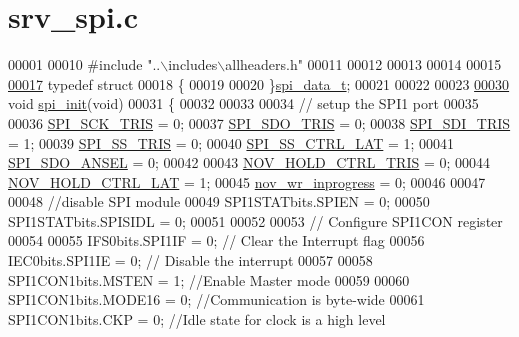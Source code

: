 \hypertarget{a00032_source}{\section{srv\+\_\+spi.\+c}
\label{a00032_source}
}

\begin{DoxyCode}
00001 
00010 \textcolor{preprocessor}{#include "..\(\backslash\)includes\(\backslash\)allheaders.h"}
00011 
00012 
00013 
00014 
00015 
\hypertarget{a00032_source_l00017}{}\hyperlink{a00032}{00017} \textcolor{keyword}{typedef} \textcolor{keyword}{struct}
00018 \{
00019 
00020 \}\hyperlink{a00032_d6/d17/a00778}{spi\_data\_t};
00021 
00022 
00023 
\hypertarget{a00032_source_l00030}{}\hyperlink{a00032_ae909944aa85ae98323073c628be541aa}{00030} \textcolor{keywordtype}{void}     \hyperlink{a00032_ae909944aa85ae98323073c628be541aa}{spi\_init}(\textcolor{keywordtype}{void})
00031 \{
00032 
00033 
00034     \textcolor{comment}{// setup the SPI1 port}
00035     
00036             \hyperlink{a00013_a98c4bd0ee0f76eb205e874355bf9cd33}{SPI\_SCK\_TRIS}        = 0;
00037             \hyperlink{a00013_aa171067a2f57d1555ab4449c78847c72}{SPI\_SDO\_TRIS}        = 0;
00038             \hyperlink{a00013_a40c85fd42ffb12b326b7cb9ee48f2ffb}{SPI\_SDI\_TRIS}        = 1;
00039             \hyperlink{a00013_a1424f86a2482cfbcf68f709ce542e262}{SPI\_SS\_TRIS}         = 0;
00040             \hyperlink{a00013_aa8b53e04161d178ebd9c01edf1584039}{SPI\_SS\_CTRL\_LAT}     = 1;
00041             \hyperlink{a00013_a11571727bdbc21b0bfb7c701599e759b}{SPI\_SDO\_ANSEL}       = 0;
00042             
00043            \hyperlink{a00029_a37dc9980ee3379d4bd3a66f7cf9d761e}{NOV\_HOLD\_CTRL\_TRIS}   = 0;
00044            \hyperlink{a00029_aa03a6ff293decd7159ed1642ccbac971}{NOV\_HOLD\_CTRL\_LAT}    = 1;
00045            \hyperlink{a00029_a56fe014653ebdce270aeac664bf86e65}{nov\_wr\_inprogress}    = 0;
00046 
00047 
00048       \textcolor{comment}{//disable SPI module}
00049        SPI1STATbits.SPIEN       = 0;
00050        SPI1STATbits.SPISIDL     = 0;
00051     
00052 
00053 \textcolor{comment}{// Configure SPI1CON register}
00054     
00055         IFS0bits.SPI1IF         = 0;    \textcolor{comment}{// Clear the Interrupt flag}
00056         IEC0bits.SPI1IE         = 0;    \textcolor{comment}{// Disable the interrupt}
00057 
00058         SPI1CON1bits.MSTEN      = 1;   \textcolor{comment}{//Enable Master mode}
00059 
00060         SPI1CON1bits.MODE16     = 0;  \textcolor{comment}{//Communication is byte-wide}
00061         SPI1CON1bits.CKP        = 0;   \textcolor{comment}{//Idle state for clock is a high level}

\end{DoxyCode}
